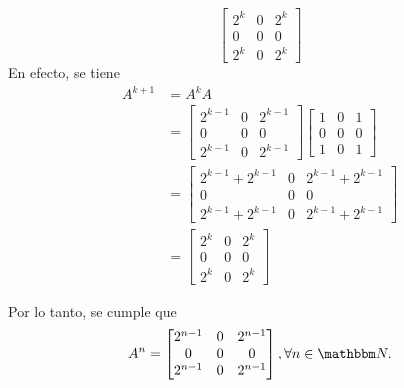 \begin{example}
\begin{enumerate}[label=\roman*.]
$$\begin{bmatrix}
            2^k & 0 & 2^k \\
            0 & 0 & 0 \\
            2^k & 0 & 2^k
        \end{bmatrix}$$
        En efecto, se tiene
        \begin{align*}
            A^{k+1} & = A^k A \\
            & = \begin{bmatrix}
                2^{k-1} & 0 & 2^{k-1} \\
                0 & 0 & 0 \\
                2^{k-1} & 0 & 2^{k-1}
            \end{bmatrix} \begin{bmatrix}
                1 & 0 & 1 \\
                0 & 0 & 0 \\
                1 & 0 & 1
            \end{bmatrix} \\
            & = \begin{bmatrix}
                2^{k-1} + 2^{k-1} & 0 & 2^{k-1} + 2^{k-1} \\
                0 & 0 & 0 \\
                2^{k-1} + 2^{k-1} & 0 & 2^{k-1} + 2^{k-1}
            \end{bmatrix} \\
            & = \begin{bmatrix}
                2^k & 0 & 2^k \\
                0 & 0 & 0 \\
                2^k & 0 & 2^k
            \end{bmatrix}
        \end{align*}
    \end{enumerate}
    Por lo tanto, se cumple que
    $$A^n = \begin{bmatrix}
        2^{n-1} & 0 & 2^{n-1} \\
        0 & 0 & 0 \\
        2^{n-1} & 0 & 2^{n-1}
    \end{bmatrix}, \forall n \in \NN .$$
\end{example}

\newpage

